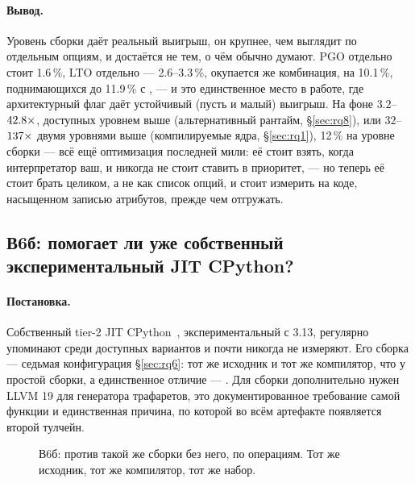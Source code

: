 \paragraph{Вывод.} Уровень сборки даёт реальный выигрыш, он крупнее, чем выглядит по отдельным
опциям, и достаётся не тем, о чём обычно думают. PGO отдельно стоит 1.6\,\%, LTO отдельно ---
2.6--3.3\,\%, окупается же комбинация, на 10.1\,\%, поднимающихся до 11.9\,\% с
, --- и это единственное место в работе, где архитектурный флаг даёт
устойчивый (пусть и малый) выигрыш. На фоне $3.2$--$\meas{ratio:b1_compute-314:matmul/cpython_loop|b1_compute-pypy311:matmul/cpython_loop}{42.8}\times$, доступных уровнем выше
(альтернативный рантайм, \S\ref{sec:rq8}), или $32$--$\meas{ratio:b1_compute-314:matmul/cpython_loop|b1_compute-314:matmul/numba_fastmath}{137}\times$ двумя уровнями выше (компилируемые
ядра, \S\ref{sec:rq1}), 12\,\% на уровне сборки --- всё ещё оптимизация последней мили: её стоит
взять, когда интерпретатор ваш, и никогда не стоит ставить в приоритет, --- но теперь её стоит
брать целиком, а не как список опций, и стоит измерить на коде, насыщенном записью атрибутов,
прежде чем отгружать.

\subsection{В6б: помогает ли уже собственный экспериментальный JIT CPython?}
\label{sec:rq6b}

\paragraph{Постановка.} Собственный tier-2 JIT CPython~\cite{pep744}, экспериментальный с 3.13,
регулярно упоминают среди доступных вариантов и почти никогда не измеряют. Его сборка --- седьмая
конфигурация \S\ref{sec:rq6}: тот же исходник и тот же компилятор, что у простой сборки, а
единственное отличие --- . Для сборки дополнительно нужен LLVM 19
для генератора трафаретов, это документированное требование самой функции и единственная причина,
по которой во всём артефакте появляется второй тулчейн.

\begin{figure}[t]
  \centering
  \caption{В6б:  против такой же сборки без него, по операциям.
    Тот же исходник, тот же компилятор, тот же набор.}
  \label{fig:tier2}
\end{figure}

